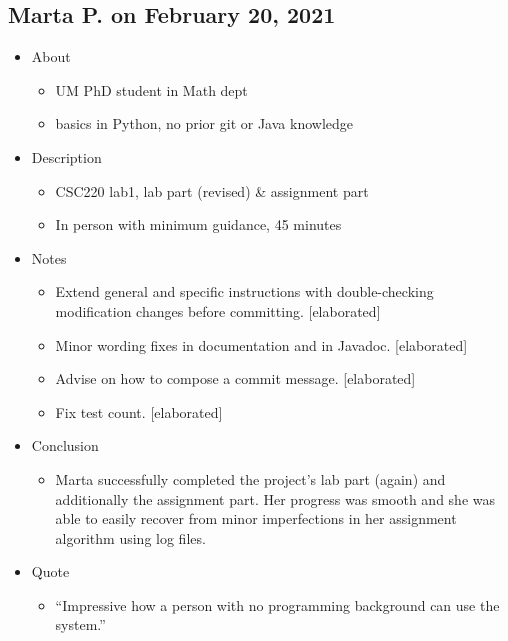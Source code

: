 \subsection{Marta P. on February 20, 2021}\label{ssec:marta0220}

\begin{itemize}
\item
  {About}
  \begin{itemize}
  \item
    {UM PhD student in Math dept}
  \item
    {basics in Python, no prior git or Java knowledge}
  \end{itemize}

\item
  {Description}
  \begin{itemize}
  \item
    {CSC220 lab1, lab part (revised) \& assignment part}
  \item
    {In person with minimum guidance, 45 minutes}
  \end{itemize}

\item
  {Notes}
  \begin{itemize}
  \item
    {Extend general and specific instructions with double-checking modification changes before committing. {[}elaborated{]}}
  \item
    {Minor wording fixes in documentation and in Javadoc. {[}elaborated{]}}
  \item
    {Advise on how to compose a commit message. {[}elaborated{]}}
  \item
    {Fix test count. {[}elaborated{]}}
  \end{itemize}

\item
  {Conclusion}
  \begin{itemize}
  \item
    {Marta successfully completed the project's lab part (again) and additionally the assignment part. Her progress was smooth and she was able to easily recover from minor imperfections in her assignment algorithm using log files.}
  \end{itemize}

\item
  {Quote}
  \begin{itemize}
  \item
    {``Impressive how a person with no programming background can use the system.''}
  \end{itemize}
\end{itemize}

